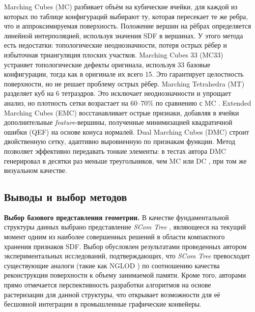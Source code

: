 Marching Cubes (MC) \cite{lorensen1987marching} разбивает объём на кубические ячейки, для каждой из которых по таблице конфигураций выбирают ту, которая пересекает те же ребра, что и аппроксимируемая поверхность.
 Положение вершин на рёбрах определяется линейной интерполяцией, используя значения SDF в вершинах. У этого метода есть недостатки: топологические неоднозначности, потеря острых рёбер и избыточная триангуляция плоских участков.
Marching Cubes 33 (MC33) \cite{chernyaev1995mc33, lewiner2003efficient} устраняет топологические дефекты оригинала, используя 33 базовые конфигурации, тогда как в оригинале \cite{lorensen1987marching} их всего 15. Это гарантирует целостность поверхности, но не решает проблему острых рёбер.
Marching Tetrahedra (MT) \cite{doi1991efficient} разделяет куб на 6 тетраэдров. Это исключает неоднозначности и упрощает анализ, но плотность сетки возрастает на 60--70\% по сравнению с MC \cite{lorensen1987marching}.
Extended Marching Cubes (EMC) \cite{kobbelt2001feature} восстанавливает острые признаки, добавляя в ячейки дополнительные \textit{feature}-вершины, полученные минимизацией квадратичной ошибки (QEF) на основе конуса нормалей.
Dual Marching Cubes (DMC) \cite{schaefer2004dmc} строит двойственную сетку, адаптивно выровненную по признакам функции. Метод позволяет эффективно передавать тонкие элементы: в тестах автора DMC генерировал в десятки раз меньше треугольников, чем MC \cite{lorensen1987marching} или DC \cite{ju2002dc}, при том же визуальном качестве.

\subsection{Выводы и выбор методов}

\textbf{Выбор базового представления геометрии.} В качестве фундаментальной структуры данных выбрано представление \textit{SCom Tree} \cite{garifullin2025compact}, являющееся на текущий момент одним из наиболее совершенных решений в области компактного хранения признаков SDF. Выбор обусловлен результатами проведенных автором \cite{garifullin2025compact} экспериментальных исследований, подтверждающих, что \textit{SCom Tree} превосходит существующие аналоги (такие как NGLOD \cite{takikawa2021neural}) по соотношению качества реконструкции поверхности к объему занимаемой памяти. Кроме того, авторами \cite{garifullin2025compact} прямо отмечается перспективность разработки алгоритмов на основе растеризации для данной структуры, что открывает возможности для её бесшовной интеграции в промышленные графические конвейеры.


